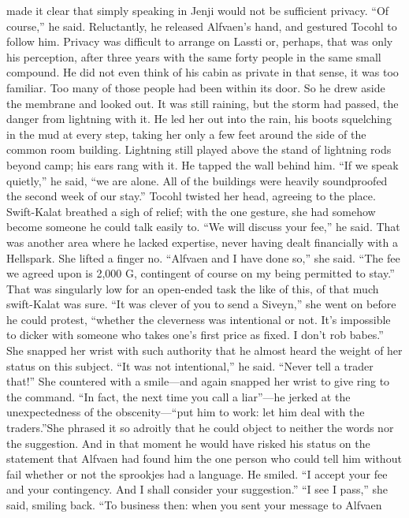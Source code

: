 \documentclass[9pt]{article}
\begin{document}
made it clear that simply speaking in Jenji would not be sufficient privacy.
“Of course,” he said. Reluctantly, he released Alfvaen’s hand, and gestured Tocohl to follow him.
Privacy was difficult to arrange on Lassti or, perhaps, that was only his perception, after three years with
the same forty people in the same small compound. He did not even think of his cabin as private in that
sense, it was too familiar. Too many of those people had been within its door. So he drew aside the
membrane and looked out. It was still raining, but the storm had passed, the danger from lightning with it.
He led her out into the rain, his boots squelching in the mud at every step, taking her only a few feet
around the side of the common room building. Lightning still played above the stand of lightning rods
beyond camp; his ears rang with it. He tapped the wall behind him. “If we speak quietly,” he said, “we
are alone. All of the buildings were heavily soundproofed the second week of our stay.”
Tocohl twisted her head, agreeing to the place. Swift-Kalat breathed a sigh of relief; with the one
gesture, she had somehow become someone he could talk easily to.
“We will discuss your fee,” he said. That was another area where he lacked expertise, never having
dealt financially with a Hellspark.
She lifted a finger no. “Alfvaen and I have done so,” she said. “The fee we agreed upon is 2,000 G,
contingent of course on my being permitted to stay.”
That was singularly low for an open-ended task the like of this, of that much swift-Kalat was sure.
“It was clever of you to send a Siveyn,” she went on before he could protest, “whether the
cleverness was intentional or not. It’s impossible to dicker with someone who takes one’s first price as
fixed. I don’t rob babes.” She snapped her wrist with such authority that he almost heard the weight of
her status on this subject.
“It was not intentional,” he said.
“Never tell a trader that!” She countered with a smile—and again snapped her wrist to give ring to
the command. “In fact, the next time you call a liar”—he jerked at the unexpectedness of the
obscenity—“put him to work: let him deal with the traders.”She phrased it so adroitly that he could object to neither the words nor the suggestion. And in that
moment he would have risked his status on the statement that Alfvaen had found him the one person who
could tell him without fail whether or not the sprookjes had a language. He smiled. “I accept your fee and
your contingency. And I shall consider your suggestion.”
“I see I pass,” she said, smiling back. “To business then: when you sent your message to Alfvaen
\end{document}
